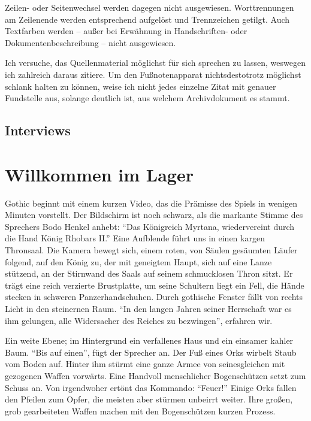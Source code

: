 \documentclass[a5paper,pagesize,numbers=noenddot]{scrbook}
\begin{document}
Zeilen- oder Seitenwechsel werden dagegen nicht ausgewiesen.
Worttrennungen am Zeilenende werden entsprechend aufgelöst und Trennzeichen getilgt.
Auch Textfarben werden -- außer bei Erwähnung in Handschriften- oder Dokumentenbeschreibung -- nicht ausgewiesen.

Ich versuche, das Quellenmaterial möglichst für sich sprechen zu lassen, weswegen ich zahlreich daraus zitiere.
Um den Fußnotenapparat nichtsdestotrotz möglichst schlank halten zu können, weise ich nicht jedes einzelne Zitat mit genauer Fundstelle aus, solange deutlich ist, aus welchem Archivdokument es stammt.


\section{Interviews}\label{ch:quellen_interviews}


\chapter{Willkommen im Lager}\label{ch:willkommen}
Gothic beginnt mit einem kurzen Video, das die Prämisse des Spiels in wenigen Minuten vorstellt.
Der Bildschirm ist noch schwarz, als die markante Stimme des Sprechers Bodo Henkel anhebt:
\enquote{Das Königreich Myrtana, wiedervereint durch die Hand König Rhobars II.}
Eine Aufblende führt uns in einen kargen Thronsaal.
Die Kamera bewegt sich, einem roten, von Säulen gesäumten Läufer folgend, auf den König zu, der mit geneigtem Haupt, sich auf eine Lanze stützend, an der Stirnwand des Saals auf seinem schmucklosen Thron sitzt.
Er trägt eine reich verzierte Brustplatte, um seine Schultern liegt ein Fell, die Hände stecken in schweren Panzerhandschuhen.
Durch gothische Fenster fällt von rechts Licht in den steinernen Raum.
\enquote{In den langen Jahren seiner Herrschaft war es ihm gelungen, alle Widersacher des Reiches zu bezwingen}, erfahren wir.

Ein weite Ebene; im Hintergrund ein verfallenes Haus und ein einsamer kahler Baum.
\enquote{Bis auf einen}, fügt der Sprecher an.
Der Fuß eines Orks wirbelt Staub vom Boden auf.
Hinter ihm stürmt eine ganze Armee von seinesgleichen mit gezogenen Waffen vorwärts.
Eine Handvoll menschlicher Bogenschützen setzt zum Schuss an.
Von irgendwoher ertönt das Kommando: \enquote{Feuer!}
Einige Orks fallen den Pfeilen zum Opfer, die meisten aber stürmen unbeirrt weiter.
Ihre großen, grob gearbeiteten Waffen machen mit den Bogenschützen kurzen Prozess.
\end{document}
